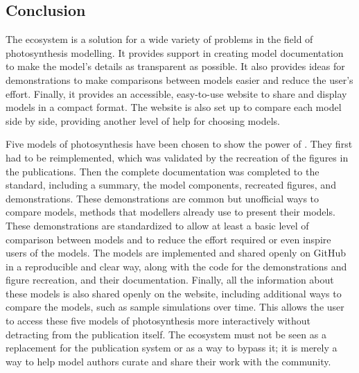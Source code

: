 \subsection{Conclusion}

The \greensloth{} ecosystem is a solution for a wide variety of problems in the field of photosynthesis modelling. It provides support in creating model documentation to make the model's details as transparent as possible. It also provides ideas for demonstrations to make comparisons between models easier and reduce the user's effort. Finally, it provides an accessible, easy-to-use website to share and display models in a compact format. The website is also set up to compare each model side by side, providing another level of help for choosing models. 

Five models of photosynthesis have been chosen to show the power of \greensloth{}. They first had to be reimplemented, which was validated by the recreation of the figures in the publications. Then the complete documentation was completed to the \greensloth{} standard, including a summary, the model components, recreated figures, and demonstrations. These demonstrations are common but unofficial ways to compare models, methods that modellers already use to present their models. These demonstrations are standardized to allow at least a basic level of comparison between models and to reduce the effort required or even inspire users of the models. The models are implemented and shared openly on GitHub in a reproducible and clear way, along with the code for the demonstrations and figure recreation, and their documentation. Finally, all the information about these models is also shared openly on the \greensloth{} website, including additional ways to compare the models, such as sample simulations over time. This allows the user to access these five models of photosynthesis more interactively without detracting from the publication itself. The \greensloth{} ecosystem must not be seen as a replacement for the publication system or as a way to bypass it; it is merely a way to help model authors curate and share their work with the community.

